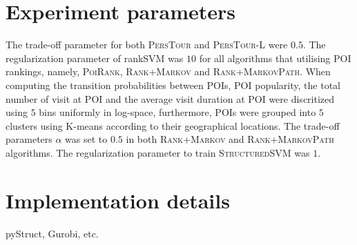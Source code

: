 \section{Experiment parameters}
The trade-off parameter for both \textsc{PersTour} and \textsc{PersTour-L} were $0.5$.
The regularization parameter of rankSVM was $10$ for all algorithms that utilising POI rankings, namely,
\textsc{PoiRank}, \textsc{Rank+Markov} and \textsc{Rank+MarkovPath}.
When computing the transition probabilities between POIs,
POI popularity, the total number of visit at POI and the average visit duration at POI were discritized using
$5$ bins uniformly in log-space, furthermore, POIs were grouped into $5$ clusters using K-means according to
their geographical locations.
The trade-off parameters $\alpha$ was set to $0.5$ in both \textsc{Rank+Markov} and \textsc{Rank+MarkovPath} algorithms.
The regularization parameter to train \textsc{StructuredSVM} was $1$.


\section{Implementation details}

pyStruct, Gurobi, etc.
